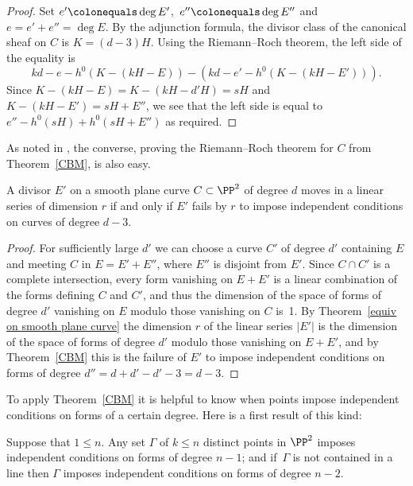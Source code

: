 \begin{proof}
Set $e' \colonequals \deg E'$, \,$e''\colonequals \deg E''$ and $e = e'+e'' = \deg E$.
By the adjunction formula, the divisor class of the canonical sheaf
on $C$ is $K = (d-3)H$. Using the Riemann--Roch theorem, the left side
of the equality is
$$
kd-e-h^0(K - (kH-E)) - \left(kd-e' - h^0(K-(kH-E'))\right).
$$
Since $K - (kH-E) = K - (kH-d'H) = sH$ and  $K-(kH-E') = sH+E''$, we see that the
left side is equal to
$
e'' - h^0(sH) +  h^0(sH+E'')
$
as required.
\unif
\end{proof}

As noted in \cite{eisenbud-gray}, the converse, proving the Riemann--Roch theorem for $C$ from Theorem~\ref{CBM}, is also easy.

\begin{corollary}\label{CBM cor 1}
A divisor $E'$ on a smooth plane curve $C\subset \PP^2$ of degree $d$ moves
in a linear series of dimension $r$ if and only if $E'$ fails by $r$ to impose
independent conditions on curves of degree $d-3$.
\unif
\end{corollary}

\begin{proof}
For sufficiently large $d'$ we can choose a curve $C'$ of degree $d'$ containing
$E$ and meeting $C$ in $E = E'+E''$, where $E''$ is disjoint from $E'$. Since $C\cap C'$
is a complete intersection, every form vanishing on $E+E'$ is a linear combination of
the forms defining $C$ and $C'$, and thus the dimension of the space of forms of degree $d'$
vanishing on $E$ modulo those vanishing on $C$ is~1. By
Theorem~\ref{equiv on smooth plane curve} the dimension $r$ of the
linear series $|E'|$ is the dimension of the space of
forms of degree $d'$ modulo those vanishing on $E+E'$, and by Theorem~\ref{CBM} this
is the failure of $E'$ to impose independent conditions on forms of degree
$d'' = d+d' - d' -3 = d-3$.
\unif
\end{proof}

To apply Theorem~\ref{CBM} it is helpful to know when points impose independent conditions on forms of a certain degree. Here is a first result of this kind:

\begin{proposition}\label{n-2 independence}
Suppose that $1\leq n$. Any set $\Gamma$ of $k\leq n$ distinct points
in $\PP^{2}$ imposes independent conditions on forms of degree $n-1$;
and if $\,\Gamma$ is not contained in a line then $\Gamma$ imposes
independent conditions on forms of degree $n-2$.
\unif
\end{proposition}


